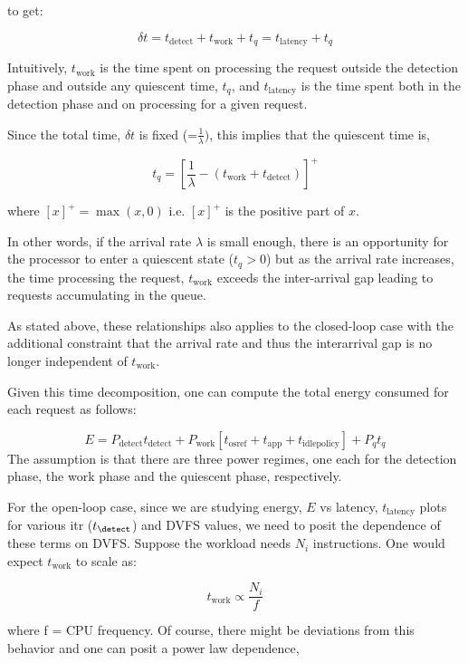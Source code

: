 to get:

$$\delta t = t_{\text{detect}} + t_{\text{work}} + t_q = t_{\text{latency}} + t_q$$

Intuitively, $t_{\text{work}}$ is the time spent on processing the request outside the detection phase and outside any quiescent time, $t_q$, and $t_{\text{latency}}$ is the time spent both in the detection phase and on processing for a given request.

Since the total time, $\delta t$ is fixed (=$\frac{1}{\lambda})$, this implies that the quiescent time is,

$$t_q = \left[\frac{1}{\lambda} - (t_\text{work} + t_{\text{detect}})\right]^+$$

where $[x]^+ = \max(x,0)$ i.e. $[x]^+$ is the positive part of $x$. 

In other words, if the arrival rate $\lambda$ is small enough, there is an opportunity for the processor to enter a quiescent state ($t_q > 0$) but as the arrival rate increases, the time processing the request, $t_\text{work}$ exceeds the inter-arrival gap leading to requests accumulating in the queue. 

As stated above, these relationships also applies to the closed-loop case with the additional constraint that the arrival rate and thus the interarrival gap is no longer independent of $t_\text{work}$.

Given this time decomposition, one can compute the total energy consumed for each request as follows:

\begin{equation}
  E = P_\text{detect} t_{\text{detect}} + P_{\text{work}} \left[t_{\text{osref}} + t_{\text{app}} + t_{\text{idlepolicy}}\right] + P_q t_q 
\label{eq:energy}
\end{equation}
The assumption is that there are three power regimes, one each for the detection phase, the work phase and the quiescent phase, respectively.

For the open-loop case, since we are studying energy, $E$ vs latency, $t_{\text{latency}}$ plots for various itr ($t_{\detect}$) and DVFS values, we need to posit the dependence of these terms on DVFS. Suppose the workload needs $N_i$ instructions. One would expect $t_\text{work}$ to scale as:

$$t_{\text{work}} \propto \frac{N_i}{f}$$

where f = CPU frequency. Of course, there might be deviations from this behavior and one can posit a power law dependence,


